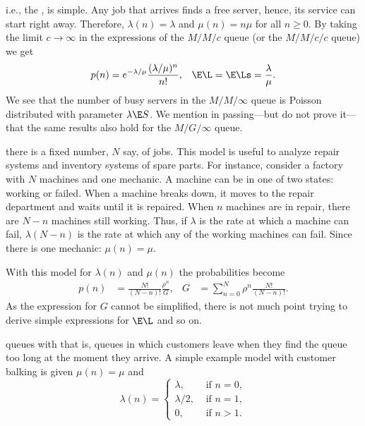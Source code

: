  i.e., the  , is simple.
Any job that arrives finds a free server, hence, its service can start right away.
Therefore, $\lambda(n)=\lambda$ and $\mu(n) = n \mu$ for all $n\geq 0$.
By taking the limit $c\to \infty$ in the expressions of the $M/M/c$ queue (or the $M/M/c/c$ queue) we get
\begin{align*}
  p(n) &= e^{-\lambda/\mu} \frac{(\lambda/\mu)^n}{n!}, & \E \L = \E \Ls = \frac \lambda \mu.
\end{align*}
We see that the number of busy servers in the $M/M/\infty$ queue is Poisson distributed with parameter $\lambda \E S$.
We mention in passing---but do not prove it---that the same results also hold for the $M/G/\infty$ queue.

 there is a fixed number, $N$ say, of jobs.
This model is useful to analyze repair systems and inventory systems of spare parts.
For instance, consider a factory with $N$ machines and one mechanic.
A machine can be in one of two states: working or failed.
When a machine breaks down, it moves to the repair department and waits until it is repaired.
When $n$ machines are in repair, there are $N-n$ machines still working.
Thus, if $\lambda$ is the rate at which a machine can fail, $\lambda(N-n)$ is the rate at which any of the working machines can fail.
Since there is one mechanic: $\mu(n)=\mu$.


With this model for $\lambda(n)$ and $\mu(n)$ the probabilities become 
\begin{align*}
 p(n)  &= \frac{N!}{(N-n)!}\frac{\rho^n}{G}, & G &= \sum_{n=0}^N \rho^n \frac{N!}{(N-n)!}.
\end{align*}
As the expression for $G$ cannot be simplified, there is not much point trying to derive simple expressions for $\E \L$ and so on.


 queues with  that is, queues in
which customers leave when they find the queue too long at the moment
they arrive. A simple example model with customer balking is given  $\mu(n)=\mu$ and
 \begin{equation*}
 \lambda(n) =
 \begin{cases}
 \lambda, &\text{ if } n=0, \\
 \lambda/2, &\text{ if } n=1, \\
 0, &\text{ if } n > 1.
 \end{cases}
 \end{equation*}

